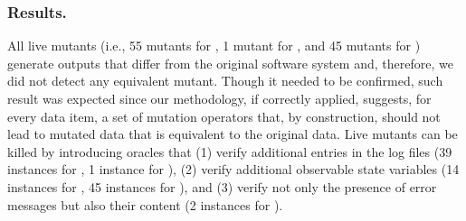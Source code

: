 



%

%


\subsubsection*{Results.} 
All live mutants (i.e., 55 mutants for \ADCS, 1 mutant for \GPS, and 45 mutants for \PARAM) generate outputs that differ from the original software system and, therefore, we did not detect any equivalent mutant. Though it needed to be confirmed, such result was expected since our methodology, if correctly applied, suggests, for every data item, a set of mutation operators that, by construction, should not lead to mutated data that is equivalent to the original data.
Live mutants can be killed by introducing oracles that (1) verify additional entries in the log files (39 instances for \ADCS, 1 instance for \GPS), (2) verify additional observable state variables (14 instances for \ADCS, 45 instances for \PARAM), and (3) verify not only the presence of error messages but also their content (2 instances for \ADCS).


